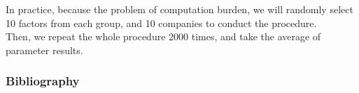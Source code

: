 \documentclass[12pt]{beamer}
\begin{document}
	\section*{}
\begin{frame}
In practice, because the problem of computation burden, we will randomly select 10 factors from each group, and 10 companies to conduct the procedure.\\
Then, we repeat the whole procedure 2000 times, and take the average of parameter results.\\ 
\end{frame}


\begin{frame}[allowframebreaks]
	\frametitle{Bibliography}
	
{\footnotesize}
\end{frame}
\end{document}
